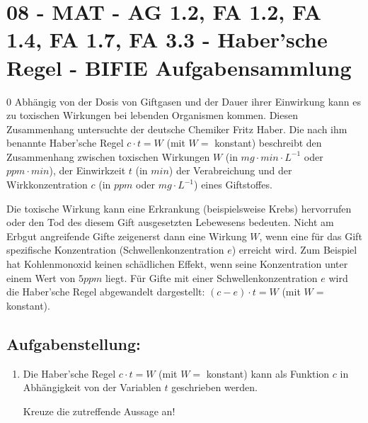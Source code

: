 \section{08 - MAT - AG 1.2, FA 1.2, FA 1.4, FA 1.7, FA 3.3 - Haber'sche Regel - BIFIE Aufgabensammlung}

\begin{langesbeispiel} \item[0] %
				Abhängig  von  der  Dosis  von  Giftgasen  und  der  Dauer  ihrer  Einwirkung  kann  es  zu  toxischen  Wirkungen bei lebenden Organismen kommen. Diesen Zusammenhang untersuchte der deutsche Chemiker Fritz Haber. Die nach ihm benannte Haber'sche Regel $c\cdot t=W$ (mit $W=$ konstant) beschreibt den Zusammenhang zwischen toxischen Wirkungen $W$ (in $mg\cdot min\cdot L^{-1}$ oder $ppm\cdot min$),  der  Einwirkzeit $t$ (in  $min$)  der  Verabreichung  und  der  Wirkkonzentration $c$ (in  $ppm$ oder $mg\cdot L^{-1}$) eines Giftstoffes.  
				
Die  toxische  Wirkung  kann  eine  Erkrankung  (beispielsweise  Krebs)  hervorrufen  oder  den  Tod  des diesem Gift ausgesetzten Lebewesens bedeuten. Nicht am Erbgut angreifende Gifte zeigenerst dann  eine  Wirkung $W$,  wenn  eine  für  das  Gift  spezifische  Konzentration  (Schwellenkonzentration $e$) erreicht  wird. Zum  Beispiel  hat  Kohlenmonoxid  keinen  schädlichen  Effekt,  wenn seine Konzentration unter einem Wert von $5 ppm$ liegt. Für Gifte mit einer Schwellenkonzentration $e$ wird die Haber'sche Regel abgewandelt dargestellt: $(c-e)\cdot t=W$ (mit $W=$ konstant). 
				
\subsection{Aufgabenstellung:}
\begin{enumerate}
	\item Die Haber'sche Regel $c\cdot t=W$ (mit $W=$ konstant) kann als Funktion $c$ in Abhängigkeit von der Variablen $t$ geschrieben werden.
	
	Kreuze die zutreffende Aussage an!
	

\end{enumerate}
\end{langesbeispiel}
